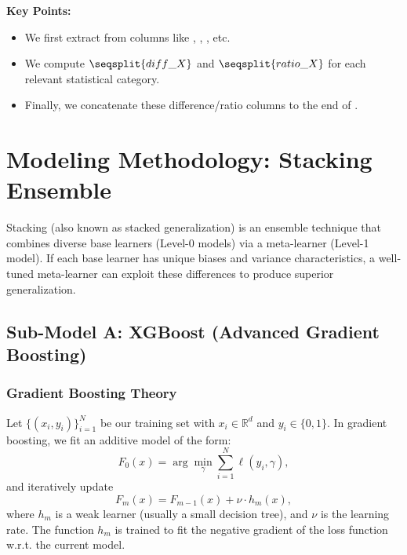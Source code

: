 \documentclass[12pt]{article}
\begin{document}
\noindent
\textbf{Key Points:}
\begin{itemize}
    \item We first extract  from columns like , , , etc.
    \item We compute \(\seqsplit{diff\_X}\) and \(\seqsplit{ratio\_X}\) for each relevant statistical category.
    \item Finally, we concatenate these difference/ratio columns to the end of .
\end{itemize}

\section{Modeling Methodology: Stacking Ensemble}
Stacking (also known as stacked generalization) is an ensemble technique that combines diverse base learners (Level-0 models) via a meta-learner (Level-1 model). If each base learner has unique biases and variance characteristics, a well-tuned meta-learner can exploit these differences to produce superior generalization.

\subsection{Sub-Model A: XGBoost (Advanced Gradient Boosting)}

\subsubsection{Gradient Boosting Theory}
Let \(\{(x_i, y_i)\}_{i=1}^N\) be our training set with \(x_i \in \mathbb{R}^d\) and \(y_i \in \{0,1\}\). In gradient boosting, we fit an additive model of the form:
\[
F_0(x) = \arg\min_\gamma \sum_{i=1}^N \ell(y_i, \gamma),
\]
and iteratively update
\[
F_m(x) = F_{m-1}(x) + \nu \cdot h_m(x),
\]
where \(h_m\) is a weak learner (usually a small decision tree), and \(\nu\) is the learning rate. The function \(h_m\) is trained to fit the negative gradient of the loss function w.r.t. the current model.
\end{document}
